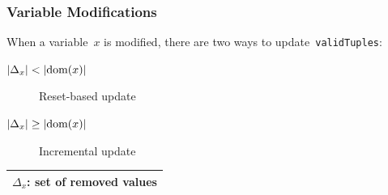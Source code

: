 \documentclass{beamer}
\newcommand{\Dom}[1]{\text{dom}({#1})}
\newcommand{\CurrTable}{\texttt{validTuples}}
\begin{document}


\begin{frame}
  \frametitle{Variable Modifications}
  When a variable~$x$ is modified, there are two ways to update~\CurrTable:
  \smallskip
  \begin{description}
    \item[$\Cardinality{\Delta_x} < \Cardinality{\Dom{x}}$] Reset-based update
    \item[$\Cardinality{\Delta_x} \geq \Cardinality{\Dom{x}}$] Incremental update
  \end{description}

  \bigskip
  \bigskip

  \begin{tabular}{|c|}
    \hline
    $\Delta_x$: set of removed values \\
    \hline
  \end{tabular}

\end{frame}
\end{document}
